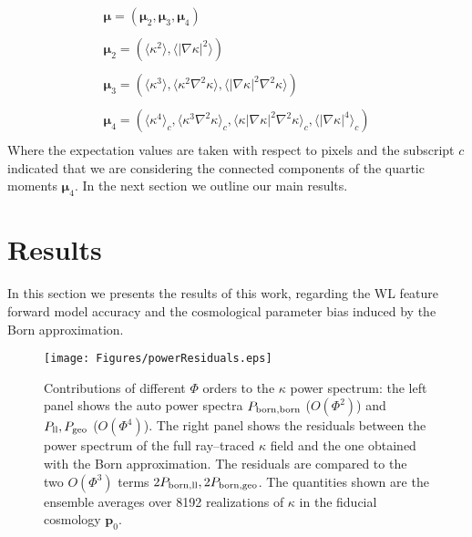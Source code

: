 \documentclass[reprint,aps,prd,superscriptaddress,showkeys,showpacs]{revtex4-1}
\newcommand{\bb}[1]{\mathbf{#1}}
\begin{document}
\begin{equation}
\label{par:moments}
\begin{matrix}
\pmb{\mu} = (\pmb{\mu}_2,\pmb{\mu}_3,\pmb{\mu}_4) \\ \\
\pmb{\mu}_2 = \left(\langle\kappa^2\rangle,\langle\vert\nabla\kappa\vert^2\rangle\right) \\ \\
\pmb{\mu}_3 = \left(\langle\kappa^3\rangle,\langle\kappa^2\nabla^2\kappa\rangle,\langle\vert\nabla\kappa\vert^2\nabla^2\kappa\rangle\right) \\ \\
\pmb{\mu}_4 = \left(\langle\kappa^4\rangle_c,\langle\kappa^3\nabla^2\kappa\rangle_c,\langle\kappa\vert\nabla\kappa\vert^2\nabla^2\kappa\rangle_c,\langle\vert\nabla\kappa\vert^4\rangle_c\right) \\
\end{matrix}
\end{equation} 
%
Where the expectation values are taken with respect to pixels and the subscript $c$ indicated that we are considering the connected components of the quartic moments $\pmb{\mu}_4$. In the next section we outline our main results.  


\section{Results}
% 
In this section we presents the results of this work, regarding the WL feature forward model accuracy and the cosmological parameter bias induced by the Born approximation.

\begin{figure*}
\begin{center}
\texttt{[image: Figures/powerResiduals.eps]}
\end{center}
\caption{Contributions of different $\Phi$ orders to the $\kappa$ power spectrum: the left panel shows the auto power spectra $P_{\rm born,born}$ ($O(\Phi^2)$) and $P_{\rm ll},P_{\rm geo}$ ($O(\Phi^4)$). The right panel shows the residuals between the power spectrum of the full ray--traced $\kappa$ field and the one obtained with the Born approximation. The residuals are compared to the two $O(\Phi^3)$ terms $2P_{\rm born,ll},2P_{\rm born,geo}$. The quantities shown are the ensemble averages over 8192 realizations of $\kappa$ in the fiducial cosmology $\bb{p}_0$.}
\label{fig:psResiduals}
\end{figure*}
\end{document}
